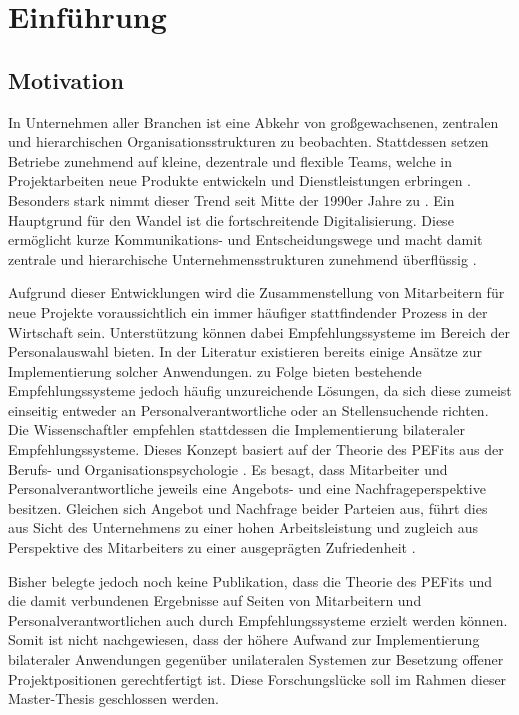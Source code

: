 \chapter{Einführung}
\label{ch:intro}

\section{Motivation}
\label{sec:intro:motivation}
In Unternehmen aller Branchen ist eine Abkehr von großgewachsenen, zentralen und hierarchischen Organisationsstrukturen zu beobachten. Stattdessen setzen Betriebe zunehmend auf kleine, dezentrale und flexible Teams, welche in Projektarbeiten neue Produkte entwickeln und Dienstleistungen erbringen \cite[S. 3]{elanceEconomy:1999}. Besonders stark nimmt dieser Trend seit Mitte der 1990er Jahre zu \cite[S. 8]{whittington:1999}. Ein Hauptgrund für den Wandel ist die fortschreitende Digitalisierung. Diese ermöglicht kurze Kommunikations- und Entscheidungswege und macht damit zentrale und hierarchische Unternehmensstrukturen zunehmend überflüssig \cite[S. 5]{elanceEconomy:1999}.

Aufgrund dieser Entwicklungen wird die Zusammenstellung von Mitarbeitern für neue Projekte voraussichtlich ein immer häufiger stattfindender Prozess in der Wirtschaft sein. Unterstützung können dabei Empfehlungssysteme im Bereich der Personalauswahl bieten. In der Literatur existieren bereits einige Ansätze zur Implementierung solcher Anwendungen. \textcite[S. 1ff.]{malinowski:2006} zu Folge bieten bestehende Empfehlungssysteme jedoch häufig unzureichende Lösungen, da sich diese zumeist einseitig entweder an Personalverantwortliche oder an Stellensuchende richten. Die Wissenschaftler empfehlen stattdessen die Implementierung bilateraler Empfehlungssysteme. Dieses Konzept basiert auf der Theorie des \acp{PEFit} aus der Berufs- und Organisationspsychologie \cite[S. 2]{guan:2021}\cite[S. 3.f]{malinowski:2006}. Es besagt, dass Mitarbeiter und Personalverantwortliche jeweils eine Angebots- und eine Nachfrageperspektive besitzen. Gleichen sich Angebot und Nachfrage beider Parteien aus, führt dies aus Sicht des Unternehmens zu einer hohen Arbeitsleistung und zugleich aus Perspektive des Mitarbeiters zu einer ausgeprägten Zufriedenheit \cite[S. 6]{su:2015}.

Bisher belegte jedoch noch keine Publikation, dass die Theorie des \acp{PEFit} und die damit verbundenen Ergebnisse auf Seiten von Mitarbeitern und Personalverantwortlichen auch durch Empfehlungssysteme erzielt werden können. Somit ist nicht nachgewiesen, dass der höhere Aufwand zur Implementierung bilateraler Anwendungen gegenüber unilateralen Systemen zur Besetzung offener Projektpositionen gerechtfertigt ist. Diese Forschungslücke soll im Rahmen dieser Master-Thesis geschlossen werden.

